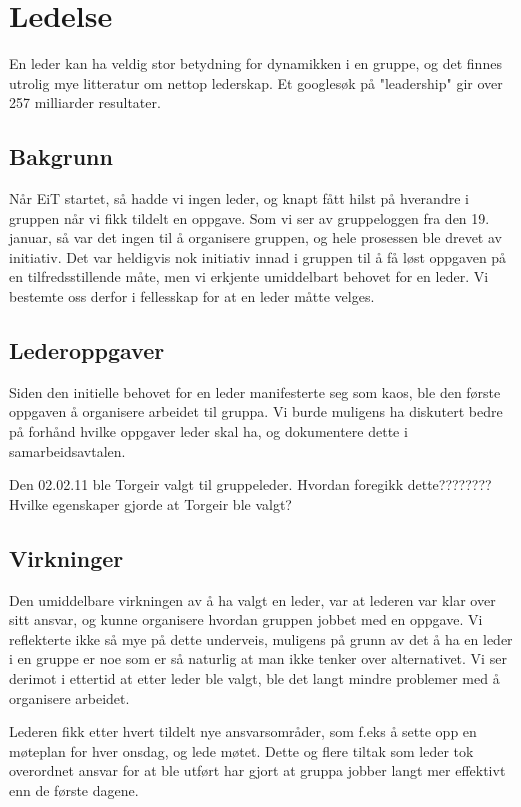 \chapter{Ledelse}
En leder kan ha veldig stor betydning for dynamikken i en gruppe, og det finnes
utrolig mye litteratur om nettop lederskap. Et googlesøk på "leadership" gir
over 257 milliarder resultater.

\section{Bakgrunn}
Når EiT startet, så hadde vi ingen leder, og knapt fått hilst på hverandre i
gruppen når vi fikk tildelt en oppgave. Som vi ser av gruppeloggen fra den 19.
januar, så var det ingen til å organisere gruppen, og hele prosessen ble drevet
av initiativ. Det var heldigvis nok initiativ innad i gruppen til å få løst
oppgaven på en tilfredsstillende måte, men vi erkjente umiddelbart behovet for
en leder. Vi bestemte oss derfor i fellesskap for at en leder måtte velges.

\section{Lederoppgaver}
Siden den initielle behovet for en leder manifesterte seg som kaos, ble den
første oppgaven å organisere arbeidet til gruppa.
Vi burde muligens ha diskutert bedre på forhånd hvilke oppgaver leder skal ha,
og dokumentere dette i samarbeidsavtalen.

Den 02.02.11 ble Torgeir valgt til gruppeleder. Hvordan foregikk dette????????
Hvilke egenskaper gjorde at Torgeir ble valgt?

\section{Virkninger}
Den umiddelbare virkningen av å ha valgt en leder, var at lederen var klar over
sitt ansvar, og kunne organisere hvordan gruppen jobbet med en oppgave. Vi 
reflekterte ikke så mye på dette underveis, muligens på grunn av det å ha en
leder i en gruppe er noe som er så naturlig at man ikke tenker over
alternativet. Vi ser derimot i ettertid at etter leder ble valgt, ble det langt
mindre problemer med å organisere arbeidet.

Lederen fikk etter hvert tildelt nye ansvarsområder, som f.eks å sette opp en
møteplan for hver onsdag, og lede møtet. Dette og flere tiltak som leder tok
overordnet ansvar for at ble utført har gjort at gruppa jobber langt mer
effektivt enn de første dagene.


